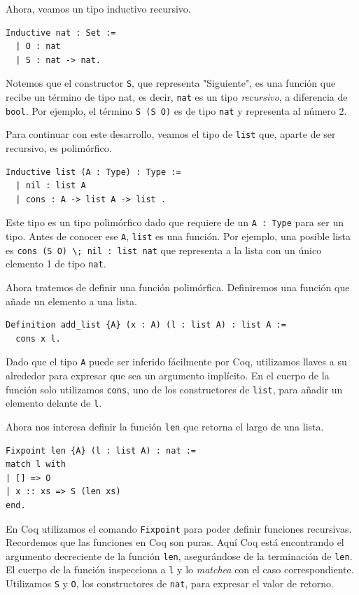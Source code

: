 Ahora, veamos un tipo inductivo recursivo.

\begin{lstlisting}
Inductive nat : Set :=
  | O : nat
  | S : nat -> nat.
\end{lstlisting}

Notemos que el constructor \lstinline{S}, que representa "Siguiente", es una función que recibe un término de tipo {nat}, es decir, \lstinline{nat} es un tipo \emph{recursivo}, a diferencia de \lstinline{bool}. Por ejemplo, el término \lstinline{S (S O)} es de tipo \lstinline{nat} y representa al número 2.

Para continuar con este desarrollo, veamos el tipo de \lstinline{list} que, aparte de ser recursivo, es polimórfico.

\begin{lstlisting}
Inductive list (A : Type) : Type :=
  | nil : list A
  | cons : A -> list A -> list .
\end{lstlisting}

Este tipo es un tipo polimórfico dado que requiere de un \lstinline{A : Type} para ser un tipo. Antes de conocer ese \lstinline{A}, \lstinline{list} es una función. Por ejemplo, una posible lista es \lstinline{cons (S O) \; nil : list nat} que representa a la lista con un único elemento 1 de tipo \lstinline{nat}.

Ahora tratemos de definir una función polimórfica.
Definiremos una función que añade un elemento a una lista.

\begin{lstlisting}
Definition add_list {A} (x : A) (l : list A) : list A :=
  cons x l.
\end{lstlisting}

Dado que el tipo \lstinline{A} puede ser inferido fácilmente por Coq, utilizamos llaves a su alrededor para expresar que sea un argumento implícito. En el cuerpo de la función solo utilizamos \lstinline{cons}, uno de los constructores de \lstinline{list}, para añadir un elemento delante de \lstinline{l}.

Ahora nos interesa definir la función \lstinline{len} que retorna el largo de una lista.

\begin{lstlisting}
Fixpoint len {A} (l : list A) : nat :=
match l with
| [] => O
| x :: xs => S (len xs)
end.
\end{lstlisting}

En Coq utilizamos el comando \lstinline{Fixpoint} para poder definir funciones recursivas. Recordemos que las funciones en Coq son puras. Aquí Coq está encontrando el argumento decreciente de la función \lstinline{len}, asegurándose de la terminación de \lstinline{len}.
El cuerpo de la función inspecciona a \lstinline{l} y lo \textit{matchea} con el caso correspondiente. Utilizamos \lstinline{S} y \lstinline{O}, los constructores de \lstinline{nat}, para expresar el valor de retorno.


